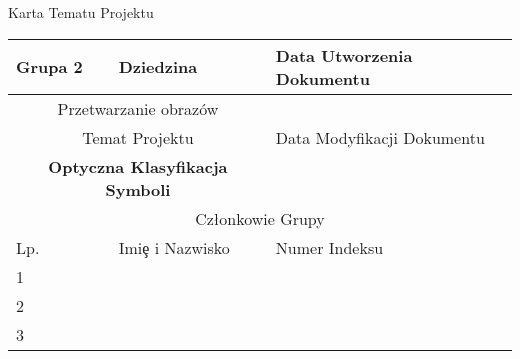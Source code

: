 \documentclass[11pt,a4paper]{article}
\begin{document}
\begin{center}
    \Large
    Karta Tematu Projektu
\end{center}
\begin{table}[h]
    \centering
    \begin{tabular}{|p{3cm}|p{5cm}|p{5cm}|}
         \hline
         Grupa 2 & Dziedzina & Data Utworzenia Dokumentu \\ \hline
        \multicolumn{2}{|c|}{Przetwarzanie obrazów} &  \\ \hline
         \multicolumn{2}{|c|}{Temat Projektu} & Data Modyfikacji Dokumentu \\ \hline
         \multicolumn{2}{|c|}{\textbf{Optyczna Klasyfikacja Symboli}} & \date{\today} \\ \hline
         \multicolumn{3}{|c|}{Członkowie Grupy} \\ \hline
         Lp. & Imi\c e i Nazwisko & Numer Indeksu \\ \hline     
         1 &  &  \\ \hline
         2 &  &  \\ \hline
         3 &  &  \\ \hline
    \end{tabular}
    \label{tab:my_label}
\end{table}
\end{document}
